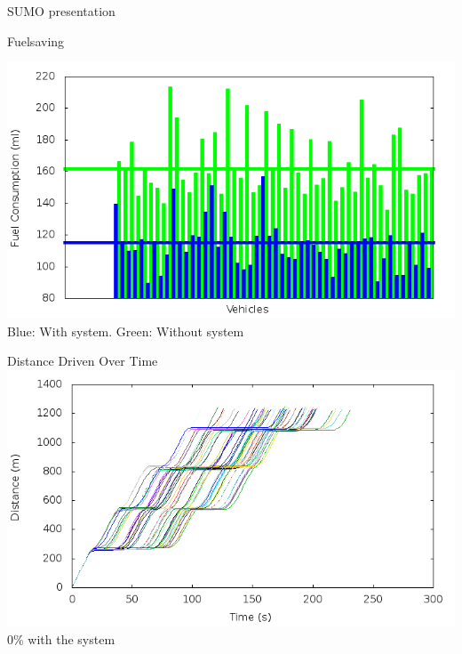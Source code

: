 \begin{frame}{SUMO presentation}
\end{frame}


\begin{frame}{Fuelsaving}

	\includegraphics[width=1\textwidth]{images/tp0/fuelRoute.png}\\
	Blue: With system. Green: Without system

\end{frame}

\begin{frame}{Distance Driven Over Time}
	\includegraphics[width=1\textwidth]{images/tp0/distance0.png}\\
	0\% with the system
\end{frame}

